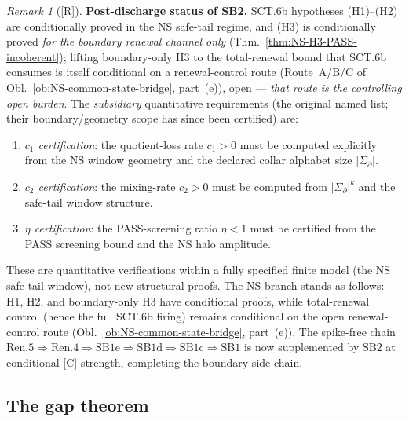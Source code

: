 \documentclass[12pt,oneside]{amsbook}
\theoremstyle{plain}
\theoremstyle{definition}
\theoremstyle{remark}
\newtheorem{remark}[theorem]{Remark}
\newcommand{\status}[1]{\textup{[#1]}}
\begin{document}
\begin{remark}[\status{R}]\label{rem:NS-SB2-status}
\textbf{Post-discharge status of SB2.}
SCT.6b hypotheses (H1)--(H2) are conditionally proved in the NS
safe-tail regime, and (H3) is conditionally proved \emph{for the
boundary renewal channel only}
(Thm.~\ref{thm:NS-H3-PASS-incoherent}); lifting boundary-only H3
to the total-renewal bound that SCT.6b consumes is itself
conditional on a renewal-control route (Route~A/B/C of
Obl.~\ref{ob:NS-common-state-bridge}, part~(e)), open ---
\emph{that route is the controlling open burden}. The
\emph{subsidiary} quantitative requirements (the original named
list; their boundary/geometry scope has since been certified) are:
\begin{enumerate}[label=\textup{(\arabic*)}]
 \item \emph{$c_1$ certification}: the quotient-loss rate
 $c_1 > 0$ must be computed explicitly from the NS window
 geometry and the declared collar alphabet size $|\Sigma_\partial|$.
 \item \emph{$c_2$ certification}: the mixing-rate $c_2 > 0$
 must be computed from $|\Sigma_\partial|^k$ and the
 safe-tail window structure.
 \item \emph{$\eta$ certification}: the PASS-screening ratio
 $\eta < 1$ must be certified from the PASS screening bound
 and the NS halo amplitude.
\end{enumerate}
These are quantitative verifications within a fully specified
finite model (the NS safe-tail window), not new structural
proofs. The NS branch stands as follows: H1, H2, and boundary-only
H3 have conditional proofs, while total-renewal control (hence the
full SCT.6b firing) remains conditional on the open renewal-control
route (Obl.~\ref{ob:NS-common-state-bridge}, part~(e)). The spike-free chain
$\mathrm{Ren.5} \Rightarrow \mathrm{Ren.4} \Rightarrow
\mathrm{SB1e} \Rightarrow \mathrm{SB1d} \Rightarrow
\mathrm{SB1c} \Rightarrow \mathrm{SB1}$ is now supplemented by
$\mathrm{SB2}$ at conditional [C] strength, completing the
boundary-side chain.
\end{remark}



\subsection{The gap theorem}
\end{document}
